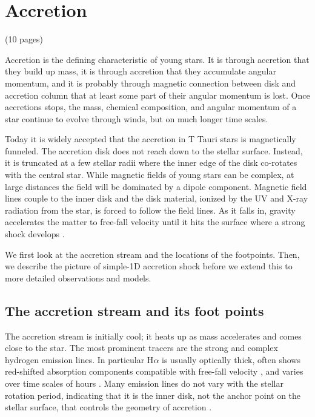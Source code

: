 


\section{Accretion \label{sect:accretion}}
{\color{blue}(10 pages)}

Accretion is the defining characteristic of young stars. It is through accretion that they build up mass, it is through accretion that they accumulate angular momentum, and it is probably through magnetic connection between disk and accretion column that at least some part of their angular momentum is lost. Once accretions stops, the mass, chemical composition, and angular momentum of a star continue to evolve through winds, but on much longer time scales.

Today it is widely accepted that the accretion in T Tauri stars is magnetically funneled. The accretion disk does not reach down to the stellar surface. Instead, it is truncated at a few stellar radii where the inner edge of the disk co-rotates with the central star. While magnetic fields of young stars can be complex, at large distances the field will be dominated by a dipole component. Magnetic field lines couple to the inner disk and the disk material, ionized by the UV and X-ray radiation from the star, is forced to follow the field lines. As it falls in, gravity accelerates the matter to free-fall velocity until it hits the surface where a strong shock develops \cite{Shu_1994}.

We first look at the accretion stream and the locations of the footpoints. Then, we describe the picture of simple-1D accretion shock  before we extend this to more detailed observations and models.

\subsection{The accretion stream and its foot points}
\label{sect:accretionsrteam}
The accretion stream is initially cool; it heats up as mass accelerates and comes close to the star. The most prominent tracers are the strong and complex hydrogen emission lines. In particular H$\alpha$ is usually optically thick, often shows red-shifted absorption components compatible with free-fall velocity \cite[e.g.][]{2000AJ....119.1881A}, and varies over time scales of hours \cite{dupree_2012}. Many emission lines do not vary with the stellar rotation period, indicating that it is the inner disk, not the anchor point on the stellar surface, that controls the geometry of accretion \cite{2021A&A...649A..68S}.

